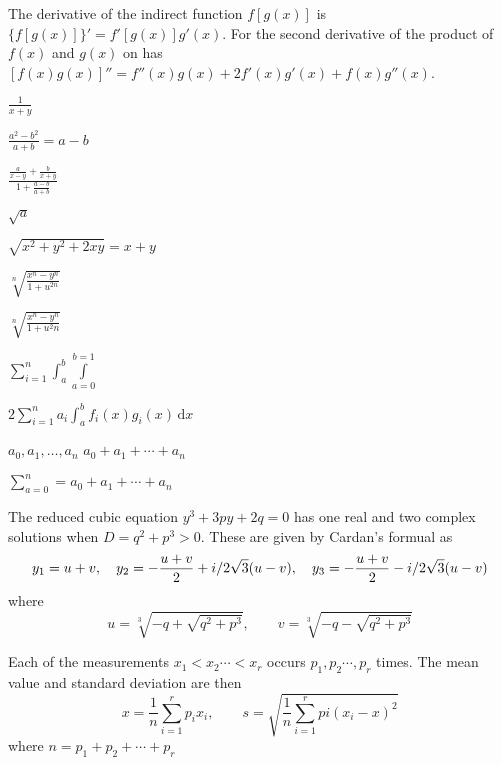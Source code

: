 \documentclass[fleqn]{article}
\begin{document}
    The derivative of the indirect function $f[g(x)]$ is $\{f[g(x)]\}' = f'[g(x)]g'(x)$.
    For the second derivative of the product of $f(x)$ and $g(x)$ on has $[f(x)g(x)]'' = f''(x)g(x) + 2f'(x)g'(x) + f(x)g''(x)$.
    
    $\frac{1}{x+y}$

    $\frac{a^2 - b^2}{a+b}=a-b$
    
    $\frac{\frac{a}{x-y} + \frac{b}{x+y}}{1+\frac{a-b}{a+b}}$

    $\sqrt{a}$


    $\sqrt{x^2+y^2+2xy}=x+y$

    $\sqrt[n]{\frac{x^n-y^n}{1+u^{2n}}}$

    $\sqrt[n]{\frac{x^n-y^n}{1+u^2n}}$

    $\sum_{i=1}^n \int_a^b \int\limits_{a=0}^{b=1}$


    $2\sum_{i=1}^n a_i \int^b_a f_i(x)g_i(x)\,\mathrm{d}x$

    $a_0,a_1,\ldots,a_n$
    $a_0 + a_1 + \cdots + a_n$

    $\sum_{a=0}^n = a_0 + a_1 + \cdots + a_n$

    The reduced cubic equation $y^3+3py+2q=0$ has one real and two complex solutions
    when $D=q^2+p^3>0$. These are given by Cardan's formual as
    \begin{equation}
        y_1=u+v,\quad y_2=-\frac{u+v}{2} + i/2\sqrt{3}(u-v),\\ \quad y_3=-\frac{u+v}{2} - i/2\sqrt{3}(u-v)
    \end{equation}
    where
    \begin{equation}
        u=\sqrt[3]{-q+\sqrt{q^2+p^3}},\qquad v=\sqrt[3]{-q-\sqrt{q^2+p^3}}
    \end{equation}

    Each of the measurements $x_1<x_2\cdots<x_r$ occurs $p_1,p_2\cdots,p_r$ times.
    The mean value and standard deviation are then
    \begin{equation}
        x=\frac{1}{n}\sum_{i=1}^rp_ix_i,\qquad s=\sqrt{\frac{1}{n}\sum_{i=1}^rpi(x_i-x)^2}
    \end{equation}
    where $n=p_1+p_2+\cdots+p_r$
\end{document}
